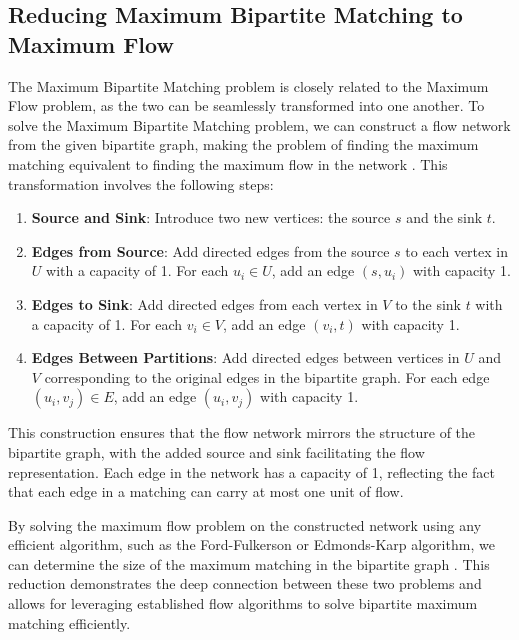 \subsection{Reducing Maximum Bipartite Matching to Maximum Flow}

The Maximum Bipartite Matching problem is closely related to the Maximum Flow problem, as the two can be seamlessly transformed into one another. To solve the Maximum Bipartite Matching problem, we can construct a flow network from the given bipartite graph, making the problem of finding the maximum matching equivalent to finding the maximum flow in the network \cite{karp_1972}. This transformation involves the following steps:

\begin{enumerate}
    \item \textbf{Source and Sink}: Introduce two new vertices: the source \( s \) and the sink \( t \).
    \item \textbf{Edges from Source}: Add directed edges from the source \( s \) to each vertex in \( U \) with a capacity of 1. For each \( u_i \in U \), add an edge \( (s, u_i) \) with capacity 1.
    \item \textbf{Edges to Sink}: Add directed edges from each vertex in \( V \) to the sink \( t \) with a capacity of 1. For each \( v_i \in V \), add an edge \( (v_i, t) \) with capacity 1.
    \item \textbf{Edges Between Partitions}: Add directed edges between vertices in \( U \) and \( V \) corresponding to the original edges in the bipartite graph. For each edge \( (u_i, v_j) \in E \), add an edge \( (u_i, v_j) \) with capacity 1.
\end{enumerate}

This construction ensures that the flow network mirrors the structure of the bipartite graph, with the added source and sink facilitating the flow representation. Each edge in the network has a capacity of 1, reflecting the fact that each edge in a matching can carry at most one unit of flow.

By solving the maximum flow problem on the constructed network using any efficient algorithm, such as the Ford-Fulkerson or Edmonds-Karp algorithm, we can determine the size of the maximum matching in the bipartite graph \cite{cormen2009introduction}. This reduction demonstrates the deep connection between these two problems and allows for leveraging established flow algorithms to solve bipartite maximum matching efficiently.


